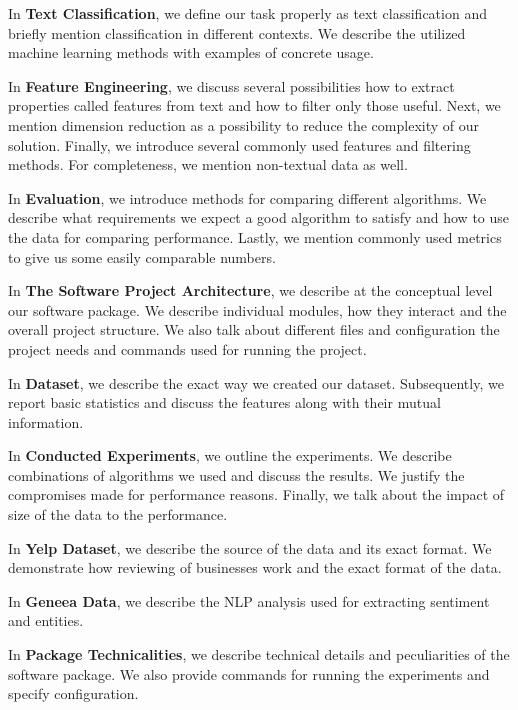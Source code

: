 In \textbf{ Text Classification}, we define our task properly as text classification and briefly mention classification in different contexts.
We describe the utilized machine learning methods with examples of concrete usage.

In \textbf{ Feature Engineering}, we discuss several possibilities how to extract properties called features from text and how to filter only those useful.
Next, we mention dimension reduction as a possibility to reduce the complexity of our solution.
Finally, we introduce several commonly used features and filtering methods.
For completeness, we mention non-textual data as well.

In \textbf{ Evaluation}, we introduce methods for comparing different algorithms.
We describe what requirements we expect a good algorithm to satisfy and how to use the data for comparing performance.
Lastly, we mention commonly used metrics to give us some easily comparable numbers.

In \textbf{ The Software Project Architecture}, we describe at the conceptual level our software package.
We describe individual modules, how they interact and the overall project structure.
We also talk about different files and configuration the project needs and commands used for running the project.

In \textbf{ Dataset}, we describe the exact way we created our dataset.
Subsequently, we report basic statistics and discuss the features along with their mutual information.

In \textbf{ Conducted Experiments}, we outline the experiments.
We describe combinations of algorithms we used and discuss the results.
We justify the compromises made for performance reasons.
Finally, we talk about the impact of size of the data to the performance.

In \textbf{ Yelp Dataset},
we describe the source of the data and its exact format.
We demonstrate how reviewing of businesses work and
the exact format of the data.

In \textbf{ Geneea Data},
we describe the NLP analysis used for extracting sentiment and entities.

In \textbf{ Package Technicalities},
we describe technical details and peculiarities of the software package.
We also provide commands for running the experiments and specify configuration.




